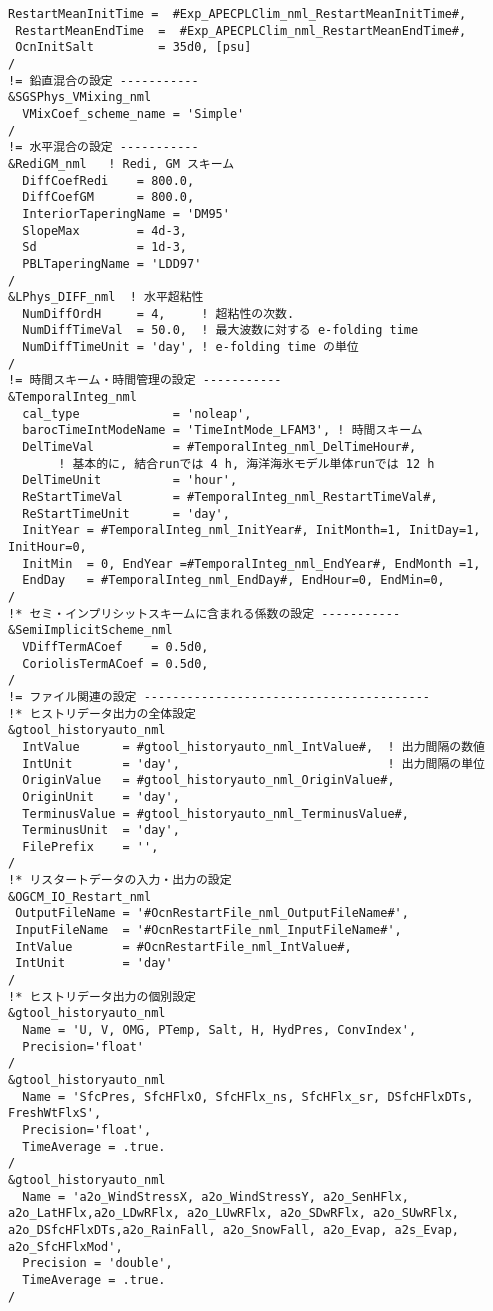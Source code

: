 \begin{lstlisting}[caption={
海洋モデルの設定ファイルのテンプレート.
ただし, \#var\#のように書かれた部分は実験ケース等ごとに適切な値が入る.
},label={dogcm_Pl64L60_conf},
basicstyle=\ttfamily\footnotesize,
frame=single]
 RestartMeanInitTime =  #Exp_APECPLClim_nml_RestartMeanInitTime#, 
 RestartMeanEndTime  =  #Exp_APECPLClim_nml_RestartMeanEndTime#, 
 OcnInitSalt         = 35d0, [psu]
/
!= 鉛直混合の設定 -----------
&SGSPhys_VMixing_nml
  VMixCoef_scheme_name = 'Simple'  
/
!= 水平混合の設定 -----------
&RediGM_nml   ! Redi, GM スキーム
  DiffCoefRedi    = 800.0,
  DiffCoefGM      = 800.0,
  InteriorTaperingName = 'DM95'
  SlopeMax        = 4d-3,
  Sd              = 1d-3, 
  PBLTaperingName = 'LDD97'
/
&LPhys_DIFF_nml  ! 水平超粘性
  NumDiffOrdH     = 4,     ! 超粘性の次数. 
  NumDiffTimeVal  = 50.0,  ! 最大波数に対する e-folding time
  NumDiffTimeUnit = 'day', ! e-folding time の単位 
/
!= 時間スキーム・時間管理の設定 -----------
&TemporalInteg_nml
  cal_type             = 'noleap', 
  barocTimeIntModeName = 'TimeIntMode_LFAM3', ! 時間スキーム
  DelTimeVal           = #TemporalInteg_nml_DelTimeHour#,
       ! 基本的に, 結合runでは 4 h, 海洋海氷モデル単体runでは 12 h 
  DelTimeUnit          = 'hour',
  ReStartTimeVal       = #TemporalInteg_nml_RestartTimeVal#, 
  ReStartTimeUnit      = 'day', 
  InitYear = #TemporalInteg_nml_InitYear#, InitMonth=1, InitDay=1, InitHour=0,
  InitMin  = 0, EndYear =#TemporalInteg_nml_EndYear#, EndMonth =1,
  EndDay   = #TemporalInteg_nml_EndDay#, EndHour=0, EndMin=0,
/
!* セミ・インプリシットスキームに含まれる係数の設定 -----------
&SemiImplicitScheme_nml
  VDiffTermACoef    = 0.5d0,
  CoriolisTermACoef = 0.5d0, 
/
!= ファイル関連の設定 ----------------------------------------
!* ヒストリデータ出力の全体設定 
&gtool_historyauto_nml
  IntValue      = #gtool_historyauto_nml_IntValue#,  ! 出力間隔の数値
  IntUnit       = 'day',                             ! 出力間隔の単位
  OriginValue   = #gtool_historyauto_nml_OriginValue#,  
  OriginUnit    = 'day',                             
  TerminusValue = #gtool_historyauto_nml_TerminusValue#,  
  TerminusUnit  = 'day',                             
  FilePrefix    = '',
/
!* リスタートデータの入力・出力の設定
&OGCM_IO_Restart_nml
 OutputFileName = '#OcnRestartFile_nml_OutputFileName#', 
 InputFileName  = '#OcnRestartFile_nml_InputFileName#', 
 IntValue       = #OcnRestartFile_nml_IntValue#, 
 IntUnit        = 'day'
/
!* ヒストリデータ出力の個別設定
&gtool_historyauto_nml
  Name = 'U, V, OMG, PTemp, Salt, H, HydPres, ConvIndex', 
  Precision='float'
/
&gtool_historyauto_nml
  Name = 'SfcPres, SfcHFlxO, SfcHFlx_ns, SfcHFlx_sr, DSfcHFlxDTs, FreshWtFlxS', 
  Precision='float', 
  TimeAverage = .true.
/
&gtool_historyauto_nml
  Name = 'a2o_WindStressX, a2o_WindStressY, a2o_SenHFlx, a2o_LatHFlx,a2o_LDwRFlx, a2o_LUwRFlx, a2o_SDwRFlx, a2o_SUwRFlx, a2o_DSfcHFlxDTs,a2o_RainFall, a2o_SnowFall, a2o_Evap, a2s_Evap, a2o_SfcHFlxMod', 
  Precision = 'double', 
  TimeAverage = .true.
/
\end{lstlisting}

